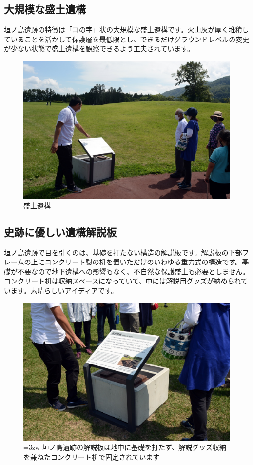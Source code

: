 \documentclass[a4j,11pt,twocolumn,openany]{jsbook}
\begin{document}
\subsection{大規模な盛土遺構}

垣ノ島遺跡の特徴は「コの字」状の大規模な盛土遺構です。火山灰が厚く堆積していることを活かして保護層を最低限とし、できるだけグラウンドレベルの変更が少ない状態で盛土遺構を観察できるよう工夫されています。

\begin{figure}[ht]
	\centering
	\includegraphics[width=\linewidth]{fig/01_Iseki_kengaku/16Kakinosima_morido.JPG}
	\caption{盛土遺構}
	\label{}
\end{figure}

\subsection{史跡に優しい遺構解説板}
垣ノ島遺跡で目を引くのは、基礎を打たない構造の解説板です。解説板の下部フレームの上にコンクリート製の枡を置いただけのいわゆる重力式の構造です。基礎が不要なので地下遺構への影響もなく、不自然な保護盛土も必要としません。コンクリート枡は収納スペースになっていて、中には解説用グッズが納められています。素晴らしいアイディアです。

\begin{figure}[ht]
	\centering
	\includegraphics[width=\linewidth]{fig/01_Iseki_kengaku/17_Kakinosima_sign.JPG}
	\caption{\hangindent=3zw
		垣ノ島遺跡の解説板は地中に基礎を打たず、解説グッズ収納を兼ねたコンクリート枡で固定されています}
	\label{}
\end{figure}
\end{document}
